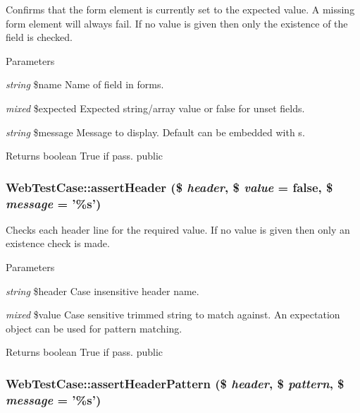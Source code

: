 \label{class_web_test_case_abfdb01d4f19a545a174dc1989d1edc88}
Confirms that the form element is currently set to the expected value. A missing form element will always fail. If no value is given then only the existence of the field is checked. 
\begin{DoxyParams}{Parameters}
\item[{\em string}]\$name Name of field in forms. \item[{\em mixed}]\$expected Expected string/array value or false for unset fields. \item[{\em string}]\$message Message to display. Default can be embedded with s. \end{DoxyParams}
\begin{DoxyReturn}{Returns}
boolean True if pass.  public 
\end{DoxyReturn}
\hypertarget{class_web_test_case_a62b3bb8ba4a2f6439a336e69fe60e40e}{
\subsubsection[{assertHeader}]{\setlength{\rightskip}{0pt plus 5cm}WebTestCase::assertHeader (\$ {\em header}, \/  \$ {\em value} = {\ttfamily false}, \/  \$ {\em message} = {\ttfamily '\%s'})}}
\label{class_web_test_case_a62b3bb8ba4a2f6439a336e69fe60e40e}
Checks each header line for the required value. If no value is given then only an existence check is made. 
\begin{DoxyParams}{Parameters}
\item[{\em string}]\$header Case insensitive header name. \item[{\em mixed}]\$value Case sensitive trimmed string to match against. An expectation object can be used for pattern matching. \end{DoxyParams}
\begin{DoxyReturn}{Returns}
boolean True if pass.  public 
\end{DoxyReturn}
\hypertarget{class_web_test_case_ae5e82c9a2219c4aa1d65d42b8a7286a0}{
\subsubsection[{assertHeaderPattern}]{\setlength{\rightskip}{0pt plus 5cm}WebTestCase::assertHeaderPattern (\$ {\em header}, \/  \$ {\em pattern}, \/  \$ {\em message} = {\ttfamily '\%s'})}}

